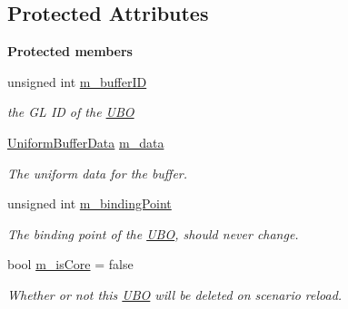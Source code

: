 \subsection*{Protected Attributes}
\begin{Indent}\textbf{ Protected members}\par
\begin{DoxyCompactItemize}
\item 
\mbox{\label{classrev_1_1_u_b_o_a62aa20fbb46369d3f65ffd4ebc051751}} 
unsigned int \mbox{\hyperlink{classrev_1_1_u_b_o_a62aa20fbb46369d3f65ffd4ebc051751}{m\+\_\+buffer\+ID}}
\begin{DoxyCompactList}\small\item\em the GL ID of the \mbox{\hyperlink{classrev_1_1_u_b_o}{U\+BO}} \end{DoxyCompactList}\item 
\mbox{\label{classrev_1_1_u_b_o_a7c6faf6a2baeeccf0af48d9c8810c48b}} 
\mbox{\hyperlink{structrev_1_1_uniform_buffer_data}{Uniform\+Buffer\+Data}} \mbox{\hyperlink{classrev_1_1_u_b_o_a7c6faf6a2baeeccf0af48d9c8810c48b}{m\+\_\+data}}
\begin{DoxyCompactList}\small\item\em The uniform data for the buffer. \end{DoxyCompactList}\item 
\mbox{\label{classrev_1_1_u_b_o_aad0abf44a0e2cb1ea28d49f482703c21}} 
unsigned int \mbox{\hyperlink{classrev_1_1_u_b_o_aad0abf44a0e2cb1ea28d49f482703c21}{m\+\_\+binding\+Point}}
\begin{DoxyCompactList}\small\item\em The binding point of the \mbox{\hyperlink{classrev_1_1_u_b_o}{U\+BO}}, should never change. \end{DoxyCompactList}\item 
\mbox{\label{classrev_1_1_u_b_o_a0b1a57a9bd8edd58df77c0dedfa31067}} 
bool \mbox{\hyperlink{classrev_1_1_u_b_o_a0b1a57a9bd8edd58df77c0dedfa31067}{m\+\_\+is\+Core}} = false
\begin{DoxyCompactList}\small\item\em Whether or not this \mbox{\hyperlink{classrev_1_1_u_b_o}{U\+BO}} will be deleted on scenario reload. \end{DoxyCompactList}\end{DoxyCompactItemize}
\end{Indent}
